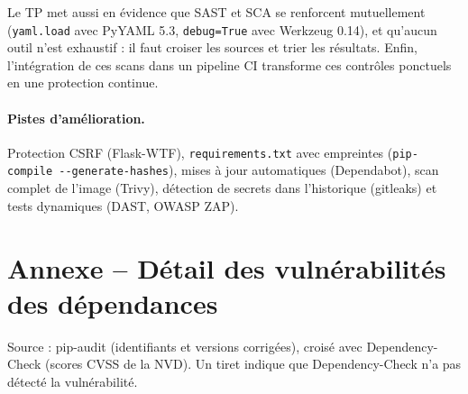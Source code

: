 \documentclass[11pt,a4paper]{article}
\newcommand{\code}[1]{\texttt{#1}}
\begin{document}
Le TP met aussi en évidence que SAST et SCA se renforcent mutuellement (\code{yaml.load} avec
PyYAML 5.3, \code{debug=True} avec Werkzeug 0.14), et qu'aucun outil n'est exhaustif : il faut
croiser les sources et trier les résultats. Enfin, l'intégration de ces scans dans un pipeline CI
transforme ces contrôles ponctuels en une protection continue.

\paragraph{Pistes d'amélioration.} Protection CSRF (Flask-WTF), \code{requirements.txt} avec
empreintes (\code{pip-compile -{}-generate-hashes}), mises à jour automatiques (Dependabot),
scan complet de l'image (Trivy), détection de secrets dans l'historique (gitleaks) et tests
dynamiques (DAST, OWASP ZAP).

\bigskip
\section*{Annexe -- Détail des vulnérabilités des dépendances}\label{sec:cve}
Source : pip-audit (identifiants et versions corrigées), croisé avec Dependency-Check (scores
CVSS de la NVD). Un tiret indique que Dependency-Check n'a pas détecté la vulnérabilité.
\end{document}
